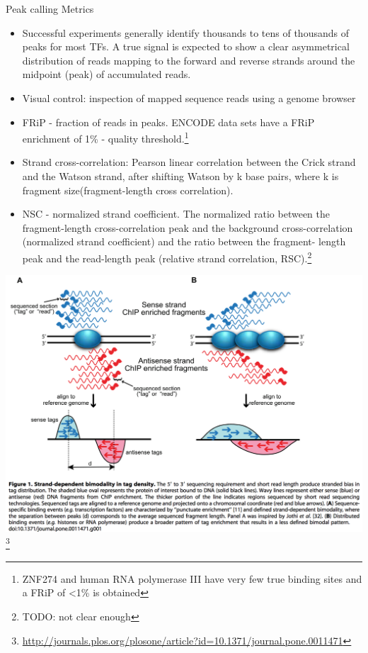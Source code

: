 \documentclass{beamer}
\begin{document}
\begin{frame}{Peak calling Metrics}
\begin{itemize}
\item Successful experiments generally identify thousands to tens of thousands of peaks for most TFs. A true signal is expected to show a clear asymmetrical distribution of reads mapping to the forward and reverse strands around the midpoint (peak) of accumulated reads.
\item Visual control: inspection of mapped sequence reads using a genome browser
\item FRiP - fraction of reads in peaks. ENCODE data sets have a FRiP enrichment of 1\% - quality threshold.\footnote{ZNF274 and human RNA polymerase III have very few true binding sites and a FRiP of <1\% is obtained}
\item Strand cross-correlation: Pearson linear correlation between the Crick strand and the Watson strand, after shifting Watson by k base pairs, where k is fragment size(fragment-length cross correlation). 
\item NSC - normalized strand coefficient. The normalized ratio between the fragment-length cross-correlation peak and the background cross-correlation (normalized strand coefficient) and the ratio between the fragment- length peak and the read-length peak (relative strand correlation, RSC).\footnote{TODO: not clear enough}
\end{itemize}
\end{frame}

\begin{frame}
\includegraphics[width=\linewidth]{chipseq.png}\footnote{\url{http://journals.plos.org/plosone/article?id=10.1371/journal.pone.0011471}}
\end{frame}
\end{document}
